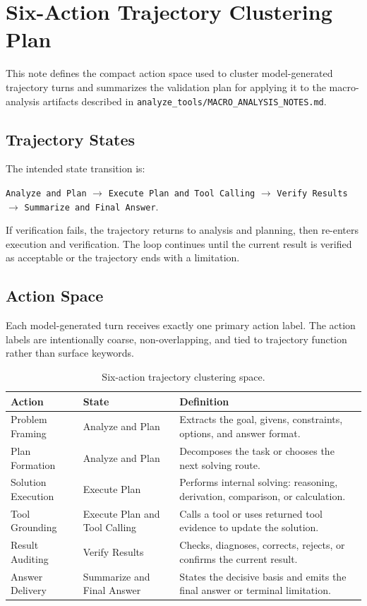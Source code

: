 \section{Six-Action Trajectory Clustering Plan}
\label{sec:six-action-trajectory-clustering}

This note defines the compact action space used to cluster model-generated
trajectory turns and summarizes the validation plan for applying it to the
macro-analysis artifacts described in \texttt{analyze\_tools/MACRO\_ANALYSIS\_NOTES.md}.

\subsection{Trajectory States}

The intended state transition is:

\begin{center}
\texttt{Analyze and Plan}
$\rightarrow$
\texttt{Execute Plan and Tool Calling}
$\rightarrow$
\texttt{Verify Results}
$\rightarrow$
\texttt{Summarize and Final Answer}.
\end{center}

If verification fails, the trajectory returns to analysis and planning, then
re-enters execution and verification. The loop continues until the current
result is verified as acceptable or the trajectory ends with a limitation.

\subsection{Action Space}

Each model-generated turn receives exactly one primary action label. The action
labels are intentionally coarse, non-overlapping, and tied to trajectory
function rather than surface keywords.

\begin{table}[h]
\centering
\small
\begin{tabular}{lll}
\toprule
Action & State & Definition \\
\midrule
Problem Framing & Analyze and Plan &
Extracts the goal, givens, constraints, options, and answer format. \\
Plan Formation & Analyze and Plan &
Decomposes the task or chooses the next solving route. \\
Solution Execution & Execute Plan &
Performs internal solving: reasoning, derivation, comparison, or calculation. \\
Tool Grounding & Execute Plan and Tool Calling &
Calls a tool or uses returned tool evidence to update the solution. \\
Result Auditing & Verify Results &
Checks, diagnoses, corrects, rejects, or confirms the current result. \\
Answer Delivery & Summarize and Final Answer &
States the decisive basis and emits the final answer or terminal limitation. \\
\bottomrule
\end{tabular}
\caption{Six-action trajectory clustering space.}
\label{tab:six-action-space}
\end{table}

